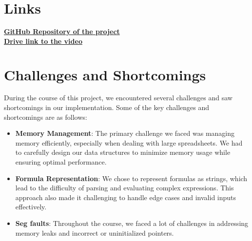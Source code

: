 \documentclass[10pt,a4paper]{article}  %
\begin{document}

\section{Links}

 \textbf{\href{https://github.com/SamyakSS83/cop_Clab}{GitHub Repository of the project}} \\
\textbf{\href{https://drive.google.com/file/d/1o8F8paz96QHjeKDYBcgtEfKU3nAkw0mr/view?usp=sharing}{Drive link to the video}}
\section{Challenges and Shortcomings}
During the course of this project, we encountered several challenges and saw shortcomings in our implementation. Some of the key challenges and shortcomings are as follows:
\begin{itemize}
    \item \textbf{Memory Management}: The primary challenge we faced was managing memory efficiently, especially when dealing with large spreadsheets. We had to carefully design our data structures to minimize memory usage while ensuring optimal performance.
    \item \textbf{Formula Representation}: We chose to represent formulas as strings, which lead to the difficulty of parsing and evaluating complex expressions. This approach also made it challenging to handle edge cases and invalid inputs effectively.
    \item \textbf{Seg faults}: Throughout the course, we faced a lot of challenges in addressing memory leaks and incorrect or uninitialized pointers.
\end{itemize}
\end{document}
